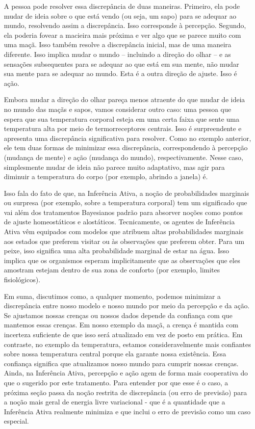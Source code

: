 \documentclass[
  12pt,
]{book}
\begin{document}
A pessoa pode resolver essa discrepância de duas maneiras. Primeiro, ela pode mudar de ideia sobre o que está vendo (ou seja, um sapo) para se adequar ao mundo, resolvendo assim a discrepância. Isso corresponde à percepção. Segundo, ela poderia fovear a macieira mais próxima e ver algo que se parece muito com uma maçã. Isso também resolve a discrepância inicial, mas de uma maneira diferente. Isso implica mudar o mundo -- incluindo a direção do olhar -- e as sensações subsequentes para se adequar ao que está em sua mente, não mudar sua mente para se adequar ao mundo. Esta é a outra direção de ajuste. Isso é ação.

Embora mudar a direção do olhar pareça menos atraente do que mudar de ideia no mundo das maçãs e sapos, vamos considerar outro caso: uma pessoa que espera que sua temperatura corporal esteja em uma certa faixa que sente uma temperatura alta por meio de termorreceptores centrais. Isso é surpreendente e apresenta uma discrepância significativa para resolver. Como no exemplo anterior, ele tem duas formas de minimizar essa discrepância, correspondendo à percepção (mudança de mente) e ação (mudança do mundo), respectivamente. Nesse caso, simplesmente mudar de ideia não parece muito adaptativo, mas agir para diminuir a temperatura do corpo (por exemplo, abrindo a janela) é.

Isso fala do fato de que, na Inferência Ativa, a noção de probabilidades marginais ou surpresa (por exemplo, sobre a temperatura corporal) tem um significado que vai além dos tratamentos Bayesianos padrão para absorver noções como pontos de ajuste homeostáticos e alostáticos. Tecnicamente, os agentes de Inferência Ativa vêm equipados com modelos que atribuem altas probabilidades marginais aos estados que preferem visitar ou às observações que preferem obter. Para um peixe, isso significa uma alta probabilidade marginal de estar na água. Isso implica que os organismos esperam implicitamente que as observações que eles amostram estejam dentro de sua zona de conforto (por exemplo, limites fisiológicos).

Em suma, discutimos como, a qualquer momento, podemos minimizar a discrepância entre nosso modelo e nosso mundo por meio da percepção e da ação. Se ajustamos nossas crenças ou nossos dados depende da confiança com que mantemos essas crenças. Em nosso exemplo da maçã, a crença é mantida com incerteza suficiente de que isso será atualizado em vez de posto em prática. Em contraste, no exemplo da temperatura, estamos consideravelmente mais confiantes sobre nossa temperatura central porque ela garante nossa existência. Essa confiança significa que atualizamos nosso mundo para cumprir nossas crenças. Ainda, na Inferência Ativa, percepção e ação agem de forma mais cooperativa do que o sugerido por este tratamento. Para entender por que esse é o caso, a próxima seção passa da noção restrita de discrepância (ou erro de previsão) para a noção mais geral de energia livre variacional - que é a quantidade que a Inferência Ativa realmente minimiza e que inclui o erro de previsão como um caso especial.
\end{document}
